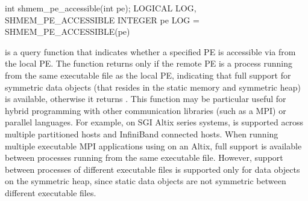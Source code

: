 \synC     
int shmem_pe_accessible(int pe); %
\synF
LOGICAL LOG, SHMEM_PE_ACCESSIBLE
INTEGER pe
LOG = SHMEM_PE_ACCESSIBLE(pe) %

{
        is  a  query function  that indicates  whether  a
       specified \ac{PE} is accessible via \openshmem from the local \ac{PE}. The  function returns  only if  the  remote  \ac{PE} is a process  running from the same executable  file as the local \ac{PE}, indicating that full \openshmem support for symmetric data objects
       (that resides in the static memory and symmetric heap) is available, otherwise it returns .
       This function may be particular useful for hybrid programming with 
       other communication libraries (such as a \ac{MPI}) or parallel languages. 
       For example, on  SGI Altix  series  systems, \openshmem is  supported  across multiple partitioned hosts and InfiniBand connected hosts. When running multiple executable MPI applications using \openshmem on an Altix,
       full \openshmem support is available between processes running from the same
       executable file. However, \openshmem support between processes of different
       executable  files  is  supported only for data objects on the symmetric
       heap, since static data objects are  not symmetric  between  different
       executable  files.        
}
{
}

\eAPI
